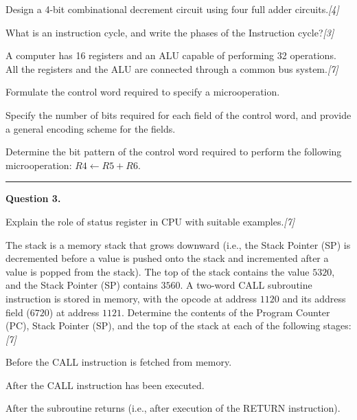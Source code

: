 \documentclass[11pt,a4paper]{article}
\newcommand{\pts}[1]{\hfill   \textit{[#1]}}
\begin{document}
\begin{parts}
  \item Design a 4-bit combinational decrement circuit using four full adder circuits.\pts{4}
  \item What is an instruction cycle, and write the phases of the Instruction cycle?\pts{3}
  \item A computer has 16 registers and an ALU capable of performing 32 operations. All the registers and the ALU are connected through a common bus system.\pts{7}
  
\begin{parts}
    \item Formulate the control word required to specify a microoperation.
    \item Specify the number of bits required for each field of the control word, and provide a general encoding scheme for the fields.
    \item Determine the bit pattern of the control word required to perform the following microoperation: $R4 \leftarrow R5 + R6$.
  \end{parts}
\end{parts}

\medskip\rule{\linewidth}{0.2pt}\medskip




\noindent   \textbf{Question 3.}

\begin{parts}
  \item Explain the role of status register in CPU with suitable examples.\pts{7}
  \item The stack is a memory stack that grows downward (i.e., the Stack Pointer (SP) is decremented before a value is pushed onto the stack and incremented after a value is popped from the stack). The top of the stack contains the value $5320$, and the Stack Pointer (SP) contains $3560$. A two-word CALL subroutine instruction is stored in memory, with the opcode at address $1120$ and its address field ($6720$) at address $1121$. Determine the contents of the Program Counter (PC), Stack Pointer (SP), and the top of the stack at each of the following stages:\pts{7}
  
\begin{parts}
    \item Before the CALL instruction is fetched from memory.
    \item After the CALL instruction has been executed.
    \item After the subroutine returns (i.e., after execution of the RETURN instruction).
  \end{parts}
\end{parts}
\end{document}
